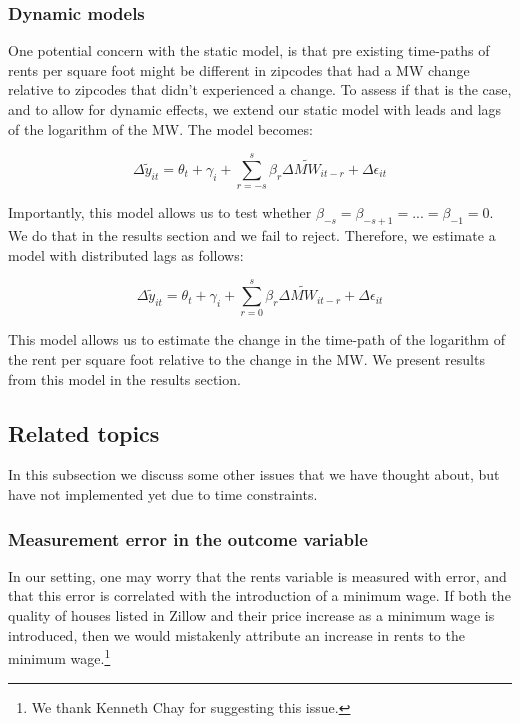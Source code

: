 \subsubsection{Dynamic models}

One potential concern with the static model, is that pre existing time-paths of rents per square foot might be different in zipcodes that had a MW change relative to zipcodes that didn't experienced a change. To assess if that is the case, and to allow for dynamic effects, we extend our static model with leads and lags of the logarithm of the MW. The model becomes:

\begin{equation}\label{eq:diff_main}
        \Delta \tilde{y}_{it} = \theta_t + \gamma_i + \sum_{r=-s}^{s}\beta_r \Delta \tilde{MW}_{it-r}+ \Delta \epsilon_{it}
\end{equation}

Importantly, this model allows us to test whether $\beta_{-s} = \beta_{-s+1} = ... = \beta_{-1} = 0$. We do that in the results section and we fail to reject. Therefore, we estimate a model with distributed lags as follows:

\begin{equation}\label{eq:diff_main}
        \Delta \tilde{y}_{it} = \theta_t + \gamma_i + \sum_{r=0}^{s}\beta_r \Delta \tilde{MW}_{it-r}+ \Delta \epsilon_{it}
\end{equation}

This model allows us to estimate the change in the time-path of the logarithm of the rent per square foot relative to the change in the MW. We present results from this model in the results section. 

\subsection{Related topics} \label{subsec:empirical_strategy/related-topics}

    In this subsection we discuss some other issues that we have thought about, but have not implemented yet due to time constraints.

    \subsubsection{Measurement error in the outcome variable}

    In our setting, one may worry that the rents variable is measured with error, and that this error is correlated with the introduction of a minimum wage. If both the quality of houses listed in Zillow and their price increase as a minimum wage is introduced, then we would mistakenly attribute an increase in rents to the minimum wage.\footnote{We thank Kenneth Chay for suggesting this issue.}
    
